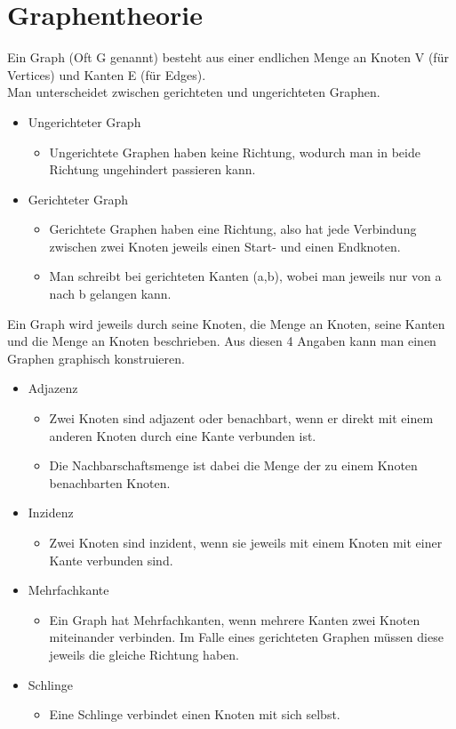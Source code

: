 \documentclass{article}
\begin{document}
	\section{Graphentheorie}
	Ein Graph (Oft G genannt) besteht aus einer endlichen Menge an Knoten V (für Vertices) und Kanten E (für Edges). \\
	Man unterscheidet zwischen gerichteten und ungerichteten Graphen.
	\begin{itemize}
		\item{Ungerichteter Graph}
		\begin{itemize}
			\item{Ungerichtete Graphen haben keine Richtung, wodurch man in beide Richtung ungehindert passieren kann.}
		\end{itemize}
		\item{Gerichteter Graph}
		\begin{itemize}
			\item{Gerichtete Graphen haben eine Richtung, also hat jede Verbindung zwischen zwei Knoten jeweils einen Start- und einen Endknoten.}
			\item{Man schreibt bei gerichteten Kanten (a,b), wobei man jeweils nur von a nach b gelangen kann.}
		\end{itemize}
	\end{itemize}
	Ein Graph wird jeweils durch seine Knoten, die Menge an Knoten, seine Kanten und die Menge an Knoten beschrieben. Aus diesen 4 Angaben kann man einen Graphen graphisch konstruieren.
	\begin{itemize}
		\item{Adjazenz}
		\begin{itemize}
			\item{Zwei Knoten sind adjazent oder benachbart, wenn er direkt mit einem anderen Knoten durch eine Kante verbunden ist.}
			\item{Die Nachbarschaftsmenge ist dabei die Menge der zu einem Knoten benachbarten Knoten.}
		\end{itemize}
		\item{Inzidenz}
		\begin{itemize}
			\item{Zwei Knoten sind inzident, wenn sie jeweils mit einem Knoten mit einer Kante verbunden sind.}
		\end{itemize}
	\end{itemize}
	\begin{itemize}
		\item{Mehrfachkante}
		\begin{itemize}
			\item{Ein Graph hat Mehrfachkanten, wenn mehrere Kanten zwei Knoten miteinander verbinden. Im Falle eines gerichteten Graphen müssen diese jeweils die gleiche Richtung haben.}
		\end{itemize}
		\item{Schlinge}
		\begin{itemize}
			\item{Eine Schlinge verbindet einen Knoten mit sich selbst.}
		\end{itemize}
	\end{itemize}
\end{document}
